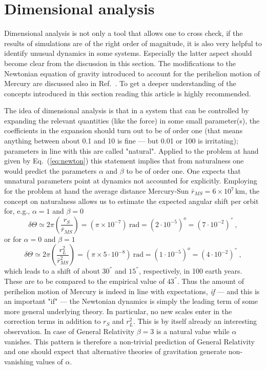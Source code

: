 \documentclass[12pt,ngerman,american]{iopart}
\begin{document}
\section{Dimensional analysis}\label{sec:analysis}

Dimensional analysis is not only a tool that allows one to cross check, if the results of simulations are of the right order of magnitude, it is also very helpful to identify unusual dynamics in some systems.
Especially the latter aspect should become clear from the discussion in this section. The modifications to the Newtonian equation of gravity introduced to account for the perihelion motion of Mercury
are discussed also in Ref.~\cite{Wells:2011st}. To get a deeper understanding of the concepts introduced in this section reading this article is highly recommended.

The idea of dimensional analysis is that in a system that can be controlled by expanding the relevant quantities (like the force) in some small parameter(s), the coefficients in the expansion should turn out to be of order one (that means anything between about 0.1 and 10 is fine --- but 0.01 or 100 is irritating); parameters in line with this are called "natural".
Applied to the problem at hand given by Eq.~(\ref{eq:newton}) this statement implies that from naturalness one would predict the parameters $\alpha$ and $\beta$ to be
of order one.
One expects that unnatural parameters point at dynamics not accounted for explicitly.
Employing for the problem at hand the average distance Mercury-Sun $\bar r_{MS}=6\times 10^7\,\mathrm{km}$, the concept on 
naturalness allows us to estimate the expected angular shift per orbit for, e.g., $\alpha=1$ and $\beta=0$
\begin{equation}
\delta \Theta \simeq 2\pi\left(\frac{r_S}{\bar r_{MS}}\right) = (\pi \times 10^{-7}) \ \mbox{rad} = (2\cdot 10^{-5})^o = (7\cdot 10^{-2}) ^{''} \ ,
\end{equation}
or for $\alpha=0$ and $\beta=1$
\begin{equation}
\delta \Theta \simeq 2\pi\left(\frac{r_L^2}{\bar r^2_{MS}}\right) = (\pi \times 5 \cdot 10^{-8}) \ \mbox{rad} = (1 \cdot 10^{-5})^o = (4\cdot 10^{-2}) ^{''} \ ,
\end{equation}
which leads to a shift of about $30^{''}$ and $15^{''}$, respectively, in 100 earth years. These are to be compared to the empirical value of $43^{''}$.
Thus the amount of perihelion motion of Mercury is indeed in line with expectations, \textit{if} --- and this is an important "if" --- the 
Newtonian dynamics is simply the leading term of some more general underlying theory. 
 In particular, no new scales enter in the correction terms in addition to $r_S$ and $r_L^2$. This is by itself already an
 interesting observation.
 In case of General Relativity $\beta=3$ is a natural value 
while $\alpha$ vanishes. This pattern is therefore a non-trivial prediction of General Relativity and one should expect
that alternative theories of gravitation generate non-vanishing values of $\alpha$. 
\end{document}

